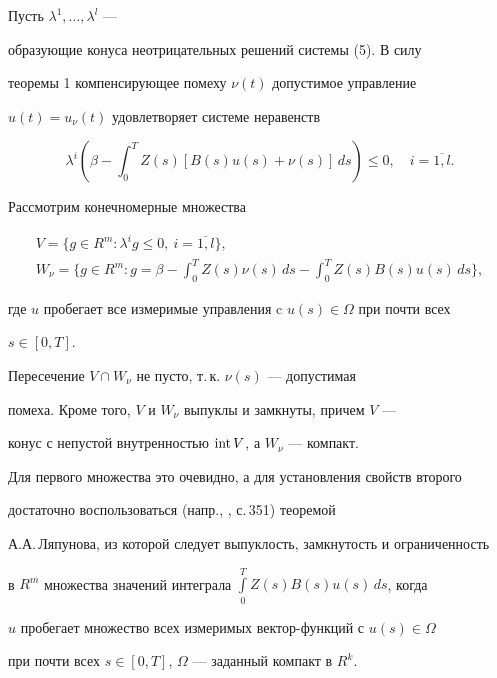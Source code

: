 \begin{pf}


Пусть $\lambda^1,\dotsc,\lambda^l$ ---


образующие конуса неотрицательных решений системы (5). В силу


теоремы 1 компенсирующее помеху $\nu(t)$ допустимое управление


$u(t) = u_\nu(t)$ удовлетворяет системе неравенств


\begin{equation}


\lambda^i(\beta - \int_0^T Z(s)[B(s)u(s) + \nu(s)]\,ds) \le 0,


\quad i=\overline{1,l}. 


\end{equation}


Рассмотрим конечномерные множества


\begin{gather*}


V = \{g\in R^m: \lambda^i g \le 0,\ i=\overline{1,l}\}, \\


W_\nu = \bigg\{g\in R^m: g = \beta - \int_0^T Z(s)\nu(s)\,ds -


\int_0^T Z(s)B(s)u(s)\,ds\bigg\},


\end{gather*}


где $u$ пробегает все измеримые управления c $u(s)\in\Omega$ при почти всех


$s\in[0,T]$.





Пересечение $V\cap W_\nu$ не пусто, т.\,к. $\nu(s)$ --- допустимая


помеха. Кроме того, $V$ и $W_\nu$ выпуклы и замкнуты, причем $V$ ---


конус с непустой внутренностью $\operatorname{int} V$, а $W_\nu$ --- компакт.


Для первого множества это очевидно, а для установления свойств второго


достаточно воспользоваться (напр., \cite{9}, с.\,351) теоремой


А.А.\,Ляпунова, из которой следует выпуклость, замкнутость и ограниченность


в $R^m$ множества значений интеграла $\int\limits_0^T Z(s)B(s)u(s)\,ds$, когда


$u$ пробегает множество всех измеримых вектор-функций с $u(s)\in\Omega$


при почти всех $s\in[0,T]$, $\Omega$ --- заданный компакт в $R^k$.






\end{pf}
